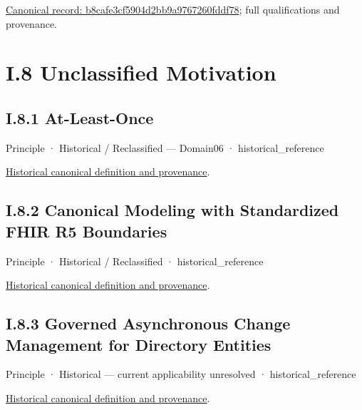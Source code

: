 {\footnotesize \href{../../../../../../../continuum/motivation/principle/architectural-axiom/b8cafe3cf5904d2bb9a9767260fddf78.md}{Canonical record: b8cafe3cf5904d2bb9a9767260fddf78}; full qualifications and provenance.}\par
\chapter*{I.8 Unclassified Motivation}
\label{navigation:I.8}

\section*{I.8.1 At-Least-Once}
\label{navigation:I.8.1}

\label{element:bd4c8726125648e68d5746bab3c765cd}
{\small Principle · Historical / Reclassified — Domain06 · historical\_reference}\par
\href{../../../../../../../continuum/motivation/principle/bd4c8726125648e68d5746bab3c765cd.md}{Historical canonical definition and provenance}.\par
\section*{I.8.2 Canonical Modeling with Standardized FHIR R5 Boundaries}
\label{navigation:I.8.2}

\label{element:5d97974406c546078b1d64e5ff85bb13}
{\small Principle · Historical / Reclassified · historical\_reference}\par
\href{../../../../../../../continuum/motivation/principle/5d97974406c546078b1d64e5ff85bb13.md}{Historical canonical definition and provenance}.\par
\section*{I.8.3 Governed Asynchronous Change Management for Directory Entities}
\label{navigation:I.8.3}

\label{element:11001a6ea3df45689a27216df641dac2}
{\small Principle · Historical — current applicability unresolved · historical\_reference}\par
\href{../../../../../../../continuum/motivation/principle/11001a6ea3df45689a27216df641dac2.md}{Historical canonical definition and provenance}.\par
